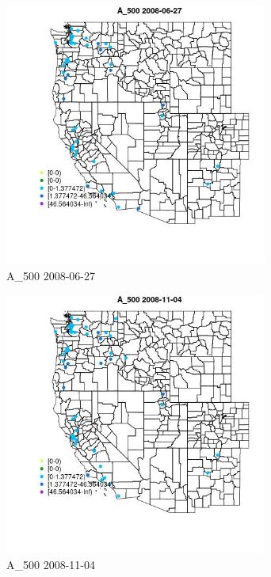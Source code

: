\begin{figure} 
\centering  
\includegraphics[width=0.77\textwidth]{Code_Outputs/Report_ML_input_PM25_Step4_part_e_de_duplicated_aves_MapObsA_5002008-06-27.jpg} 
\caption{\label{fig:Report_ML_input_PM25_Step4_part_e_de_duplicated_avesMapObsA_5002008-06-27}A_500 2008-06-27} 
\end{figure} 
 

\begin{figure} 
\centering  
\includegraphics[width=0.77\textwidth]{Code_Outputs/Report_ML_input_PM25_Step4_part_e_de_duplicated_aves_MapObsA_5002008-11-04.jpg} 
\caption{\label{fig:Report_ML_input_PM25_Step4_part_e_de_duplicated_avesMapObsA_5002008-11-04}A_500 2008-11-04} 
\end{figure} 
 

